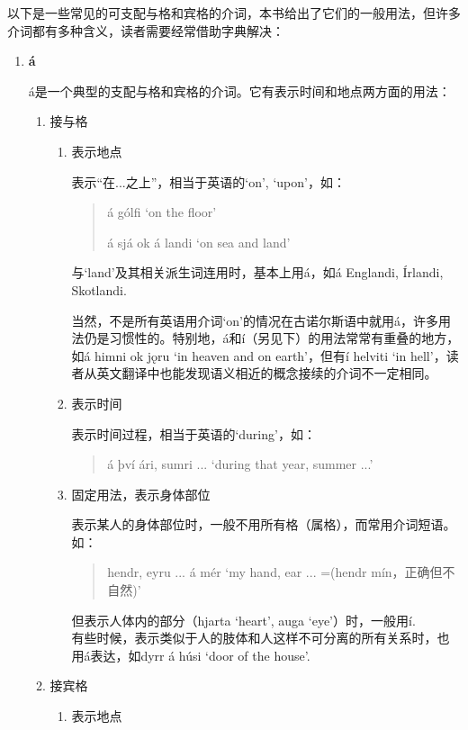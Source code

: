 以下是一些常见的可支配与格和宾格的介词，本书给出了它们的一般用法，但许多介词都有多种含义，读者需要经常借助字典解决：
\begin{enumerate}[itemindent=1em, label=\textbf{\arabic*}.]
    \item \textbf{á} \label{prep:on}

          á是一个典型的支配与格和宾格的介词。它有表示时间和地点两方面的用法：
          \begin{enumerate}
              \item 接与格
                    \begin{enumerate}
                        \item 表示地点

                              表示“在...之上”，相当于英语的`on', `upon'，如：

                              \begin{quote}
                                  á gólfi `on the floor'

                                  á sjá ok á landi `on sea and land'
                              \end{quote}
                              与`land'及其相关派生词连用时，基本上用á，如á Englandi, Írlandi, Skotlandi.

                              当然，不是所有英语用介词`on'的情况在古诺尔斯语中就用á，许多用法仍是习惯性的。特别地，á和\'{i}（另见下）的用法常常有重叠的地方，如á himni ok j\k{o}r\dh u `in heaven and on earth'，但有í helviti `in hell'，读者从英文翻译中也能发现语义相近的概念接续的介词不一定相同。
                        \item 表示时间

                              表示时间过程，相当于英语的`during'，如：
                              \begin{quote}
                                  á því ári, sumri ... `during that year, summer ...'
                              \end{quote}

                        \item 固定用法，表示身体部位

                              表示某人的身体部位时，一般不用所有格（属格），而常用介词短语。如：
                              \begin{quote}
                                  hendr, eyru ... á mér `my hand, ear ... =(hendr mín，正确但不自然)'
                              \end{quote}
                              但表示人体内的部分（hjarta `heart', auga `eye'）时，一般用í.\\
                              有些时候，表示类似于人的肢体和人这样不可分离的所有关系时，也用á表达，如dyrr á húsi `door of the house'.
                    \end{enumerate}
              \item 接宾格
                    \begin{enumerate}
                        \item 表示地点


\end{enumerate}
\end{enumerate}
\end{enumerate}
